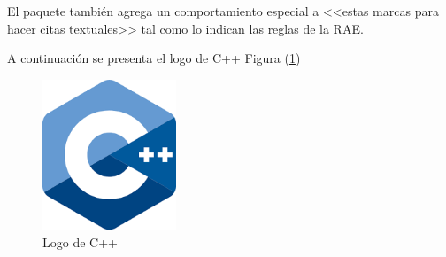 \documentclass{article}
\begin{document}
El paquete también agrega un comportamiento especial 
a <<estas marcas para hacer citas textuales>> tal como 
lo indican las reglas de la RAE. \cite{romram}

\vspace{5mm}

A continuación se presenta el logo de C++ Figura (\ref{fig:cpplogo})

\begin{figure}[h]
\includegraphics[width=4cm]{cpplogo.png}
\centering
\caption{Logo de C++}
\label{fig:cpplogo}
\end{figure}

\clearpage


\nocite{*}
\end{document}
